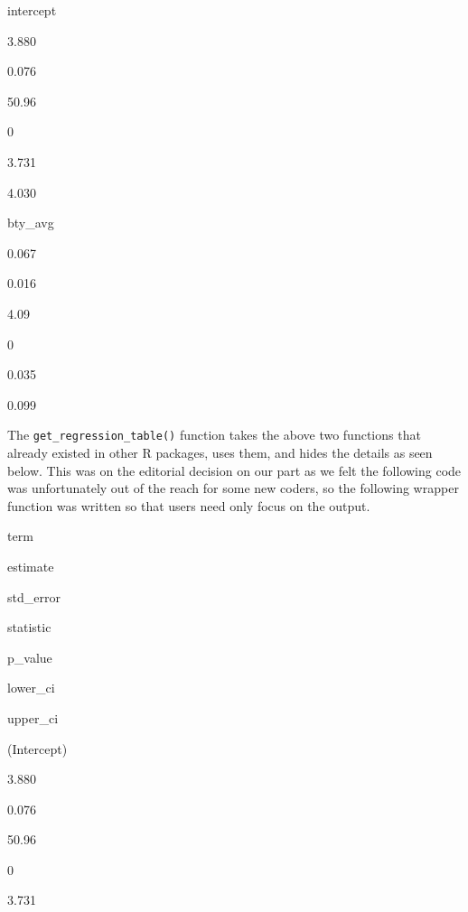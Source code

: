 \documentclass[12pt,]{krantz}
\makeatletter
\newenvironment{Shaded}{\begin{snugshade}}{\end{snugshade}}
\newcommand{\KeywordTok}[1]{\textcolor[rgb]{0.27,0.27,0.27}{\textbf{#1}}}
\newcommand{\DataTypeTok}[1]{\textcolor[rgb]{0.27,0.27,0.27}{#1}}
\newcommand{\DecValTok}[1]{\textcolor[rgb]{0.06,0.06,0.06}{#1}}
\newcommand{\StringTok}[1]{\textcolor[rgb]{0.5,0.5,0.5}{#1}}
\newcommand{\OtherTok}[1]{\textcolor[rgb]{0.37,0.37,0.37}{#1}}
\newcommand{\OperatorTok}[1]{\textcolor[rgb]{0.43,0.43,0.43}{\textbf{#1}}}
\newcommand{\NormalTok}[1]{#1}
\newenvironment{kframe}{%
\medskip{}
\setlength{\fboxsep}{.8em}
 \def\at@end@of@kframe{}%
 \ifinner\ifhmode%
  \def\at@end@of@kframe{\end{minipage}}%
  \begin{minipage}{\columnwidth}%
 \fi\fi%
 \def\FrameCommand##1{\hskip\@totalleftmargin \hskip-\fboxsep
 \colorbox{shadecolor}{##1}\hskip-\fboxsep
     \hskip-\linewidth \hskip-\@totalleftmargin \hskip\columnwidth}%
 \MakeFramed {\advance\hsize-\width
   \@totalleftmargin\z@ \linewidth\hsize
   \@setminipage}}%
 {\par\unskip\endMakeFramed%
 \at@end@of@kframe}
\renewenvironment{Shaded}{\begin{kframe}}{\end{kframe}}
\makeatother
\begin{document}
intercept

3.880

0.076

50.96

0

3.731

4.030

bty\_avg

0.067

0.016

4.09

0

0.035

0.099

The \texttt{get\_regression\_table()} function takes the above two
functions that already existed in other R packages, uses them, and hides
the details as seen below. This was on the editorial decision on our
part as we felt the following code was unfortunately out of the reach
for some new coders, so the following wrapper function was written so
that users need only focus on the output.

\begin{Shaded}
\end{Shaded}

term

estimate

std\_error

statistic

p\_value

lower\_ci

upper\_ci

(Intercept)

3.880

0.076

50.96

0

3.731
\end{document}
